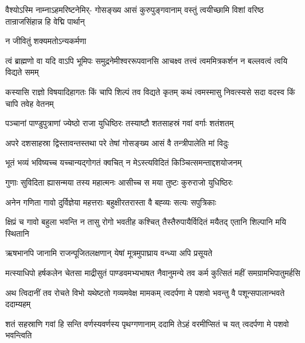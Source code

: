 \fourlineindentedshloka
{वैश्योऽस्मि नाम्नाऽहमरिष्टनेमिर्-}
{गोसङ्ख्य आसं कुरुपुङ्गवानाम्}
{वस्तुं त्वयीच्छामि विशां वरिष्ठ}
{तान्राजसिंहान्न हि वेद्मि पार्थान्}


{न जीवितुं शक्यमतोऽन्यकर्मणा\hspace{\shlokaspaceskip}}\\





\fourlineindentedshloka
{त्वं ब्राह्मणो वा यदि वाऽपि भूमिपः}
{समुद्रनेमीश्वररूपवानसि}
{आचक्ष्व तत्त्वं त्वममित्रकर्शन}
{न बल्लवत्वं त्वयि विद्यते समम्}


\fourlineindentedshloka
{कस्यासि राज्ञो विषयादिहागतः}
{किं चापि शिल्पं तव विद्यते कृतम्}
{कथं त्वमस्मासु निवत्स्यसे सदा}
{वदस्व किं चापि तवेह वेतनम्}




\twolineshloka
{पञ्चानां पाण्डुपुत्राणां ज्येष्ठो राजा युधिष्ठिरः}
{तस्याष्टौ शतसाहस्रं गवां वर्गाः शतंशतम्}


\twolineshloka
{अपरे दशसाहस्रा द्विस्तावन्तस्तथा परे}
{तेषां गोसङ्ख्य आसं वै तन्त्रीपालेति मां विदुः}


\twolineshloka
{भूतं भव्यं भविष्यच्च यच्चान्यद्गोगतं क्वचित्}
{न मेऽस्त्यविदितं किञ्चित्समन्ताद्दशयोजनम्}


\twolineshloka
{गुणाः सुविदिता ह्यासन्मया तस्य महात्मनः}
{आसीच्च स मया तुष्टः कुरुराजो युधिष्ठिरः}


\twolineshloka
{अनेन गणिता गावो दुर्विज्ञेया महत्तराः}
{बहुक्षीरतरास्ता वै बह्व्यः सत्यः सपुत्रिकाः}


\fourlineindentedshloka
{क्षिप्रं च गावो बहुला भवन्ति}
{न तासु रोगो भवतीह कश्चित्}
{तैस्तैरुपायैर्विदितं मयैतद्}
{एतानि शिल्पानि मयि स्थितानि}


\twolineshloka
{ऋषभानपि जानामि राजन्पूजितलक्षणान्}
{येषां मूत्रमुपाघ्राय वन्ध्या अपि प्रसूयते}



\fourlineindentedshloka
{मत्स्याधिपो हर्षकलेन चेतसा}
{माद्रीसुतं पाण्डवमभ्यभाषत}
{नैवानुमन्ये तव कर्म कुत्सितं}
{महीं समग्रामभिपातुमर्हसि}


\fourlineindentedshloka
{अथ त्विदानीं तव रोचते विभो}
{यथेष्टतो गव्यमवेक्ष मामकम्}
{त्वदर्पणा मे पशवो भवन्तु वै}
{पशून्सपालान्भवते ददाम्यहम्}


\fourlineindentedshloka
{शतं सहस्राणि गवां हि सन्ति}
{वर्णस्यवर्णस्य पृथग्गणानाम्}
{ददामि तेऽहं वरमीप्सितं च यत्}
{त्वदर्पणा मे पशवो भवन्त्विति}


